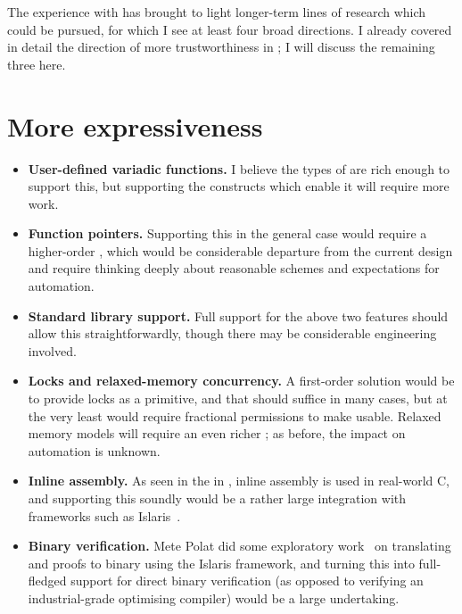 The experience with  has brought to light longer-term lines of research
which could be pursued, for which I see at least four broad directions. I
already covered in detail the direction of more trustworthiness in
; I will discuss the remaining three here.

\section{More expressiveness}

\begin{itemize}
    \item \textbf{User-defined variadic functions.} I believe the types of
         are rich enough to support this, but supporting the
         constructs which enable it will require more work.
    \item \textbf{Function pointers.} Supporting this in the general
        case would require a higher-order , which would
        be considerable departure from the current design and require
        thinking deeply about reasonable schemes and expectations for
        automation.
    \item \textbf{Standard library support.} Full support for the above
        two features should allow this straightforwardly, though
        there may be considerable engineering involved.
    \item \textbf{Locks and relaxed-memory concurrency.} A first-order solution
        would be to provide locks as a primitive, and that should suffice in
        many cases, but at the very least would require fractional permissions
        to make usable. Relaxed memory models will require an even richer
        ; as before, the impact on automation is unknown.
    \item \textbf{Inline assembly.} As seen in the  in
        , inline assembly is used in real-world C, and supporting
        this soundly would be a rather large integration with frameworks
        such as Islaris~.
    \item \textbf{Binary verification.} Mete Polat did some exploratory
        work~ on translating  and proofs to binary using the
        Islaris framework, and turning this into full-fledged support
        for direct binary verification (as opposed to verifying an
        industrial-grade optimising compiler) would be a large undertaking.
\end{itemize}

